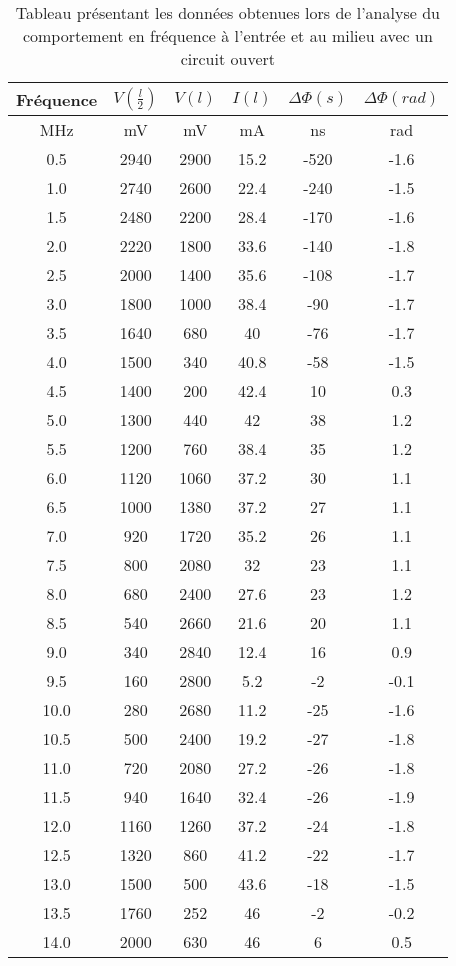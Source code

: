 \begin{table}[H]
  \centering
    \begin{tabular}{|c|c|c|c|c|c|}\hline
    Fréquence & $V\left(\frac{l}{2}\right)$ & $V(l)$ & $I(l)$ & $\Delta \Phi (s)$ & $\Delta \Phi (rad)$ \\\hline
    MHz   & mV    & mV    & mA    & ns    & rad \\\hline
    0.5   & 2940  & 2900  & 15.2  & -520  & -1.6 \\
    1.0   & 2740  & 2600  & 22.4  & -240  & -1.5 \\
    1.5   & 2480  & 2200  & 28.4  & -170  & -1.6 \\
    2.0   & 2220  & 1800  & 33.6  & -140  & -1.8 \\
    2.5   & 2000  & 1400  & 35.6  & -108  & -1.7 \\
    3.0   & 1800  & 1000  & 38.4  & -90   & -1.7 \\
    3.5   & 1640  & 680   & 40    & -76   & -1.7 \\
    4.0   & 1500  & 340   & 40.8  & -58   & -1.5 \\
    4.5   & 1400  & 200   & 42.4  & 10    & 0.3 \\
    5.0   & 1300  & 440   & 42    & 38    & 1.2 \\
    5.5   & 1200  & 760   & 38.4  & 35    & 1.2 \\
    6.0   & 1120  & 1060  & 37.2  & 30    & 1.1 \\
    6.5   & 1000  & 1380  & 37.2  & 27    & 1.1 \\
    7.0   & 920   & 1720  & 35.2  & 26    & 1.1 \\
    7.5   & 800   & 2080  & 32    & 23    & 1.1 \\
    8.0   & 680   & 2400  & 27.6  & 23    & 1.2 \\
    8.5   & 540   & 2660  & 21.6  & 20    & 1.1 \\
    9.0   & 340   & 2840  & 12.4  & 16    & 0.9 \\
    9.5   & 160   & 2800  & 5.2   & -2    & -0.1 \\
    10.0  & 280   & 2680  & 11.2  & -25   & -1.6 \\
    10.5  & 500   & 2400  & 19.2  & -27   & -1.8 \\
    11.0  & 720   & 2080  & 27.2  & -26   & -1.8 \\
    11.5  & 940   & 1640  & 32.4  & -26   & -1.9 \\
    12.0  & 1160  & 1260  & 37.2  & -24   & -1.8 \\
    12.5  & 1320  & 860   & 41.2  & -22   & -1.7 \\
    13.0  & 1500  & 500   & 43.6  & -18   & -1.5 \\
    13.5  & 1760  & 252   & 46    & -2    & -0.2 \\
    14.0  & 2000  & 630   & 46    & 6     & 0.5 \\\hline
    
    \end{tabular}%
 \caption{Tableau présentant les données obtenues lors de l'analyse du comportement en fréquence à l'entrée et au milieu avec un circuit ouvert}
 \label{tab:3}%
 \end{table}%
